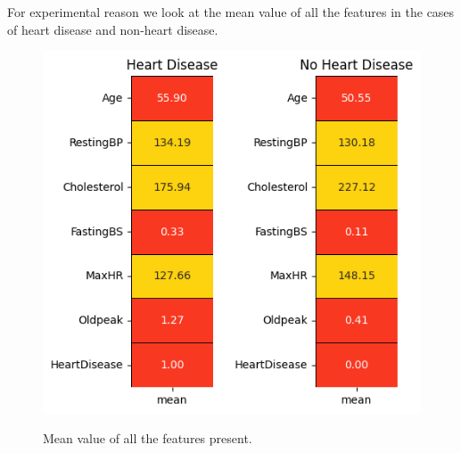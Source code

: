 For experimental reason we look at the mean value of all the features in the cases of heart disease and non-heart disease.
\begin{figure}[!htpb]
    \centering
    \includegraphics[width=\linewidth]{Figures/Outputs/mean-vals.png}
    \label{Mean value of all the features}
    \caption{Mean value of all the features present.}
\end{figure}